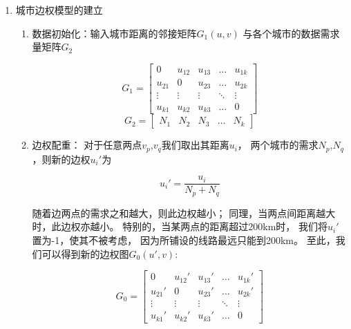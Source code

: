 \documentclass[UTF8,12pt]{ctexart}
\begin{document}
\begin{enumerate}
            \item 城市边权模型的建立
                \begin{enumerate}
                    \item 数据初始化：输入城市距离的邻接矩阵$G_1(u,v)$
                        与各个城市的数据需求量矩阵$G_2$
                        \begin{large}
                            $$G_1 = \begin{bmatrix}
                            0 & u_{12} &u_{13}&\ldots&u_{1k}\\
                            u_{21} & 0 &u_{23}&\ldots&u_{2k}\\
                            \vdots &  \vdots &   \vdots   &  \ddots    &\vdots\\
                            u_{k1} &u_{k2}& u_{k3}& \ldots  &0
                            \end{bmatrix}$$
                            $$G_2=\begin{bmatrix} N_1&N_2&N_3 &\ldots &N_k\end{bmatrix}$$
                        \end{large}                    
                    \item 边权配重：
                        对于任意两点$v_p$,$v_q$我们取出其距离$u_i$，
                        两个城市的需求$N_p$,$N_q$，则新的边权$u_{i}'$为
                        \begin{large}
                            $$u_{i}' = \frac {u_i}{N_p+N_q}$$
                        \end{large}
                        随着边两点的需求之和越大，则此边权越小；
                        同理，当两点间距离越大时，此边权亦越小。
                        特别的，当某两点的距离超过200km时，
                        我们将$u_{i}'$置为-1，使其不被考虑，
                        因为所铺设的线路最远只能到200km。
                        至此，我们可以得到新的边权图$G_{0}(u',v)$:
                        \begin{large}
                            $$G_0 = \begin{bmatrix}
                            0 & u_{12}' &u_{13} '&\ldots&u_{1k}'\\
                            u_{21}' & 0 &u_{23}'&\ldots&u_{2k}'\\
                            \vdots &\vdots &\vdots&\ddots&\vdots\\
                            u_{k1}' &u_{k2}'& u_{k3}'& \ldots  &0
                            \end{bmatrix}$$
                        \end{large}
                \end{enumerate}
        \end{enumerate}
    
\end{document}

